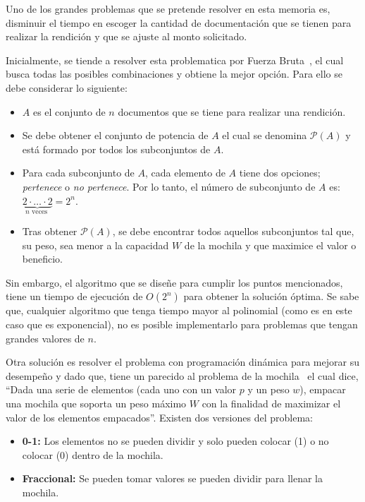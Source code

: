 Uno de los grandes problemas que se pretende resolver en esta memoria es, disminuir el tiempo en escoger la cantidad de documentación que se tienen para realizar la rendición y que se ajuste al monto solicitado.

Inicialmente, se tiende a resolver esta problematica por Fuerza Bruta~\cite{22}, el cual busca todas las posibles combinaciones y obtiene la mejor opción. Para ello se debe considerar lo siguiente:

\begin{itemize}
    \item $A$ es el conjunto de $n$ documentos que se tiene para realizar una rendición.
    \item Se debe obtener el conjunto de potencia de $A$ el cual se denomina $\mathcal{P}(A)$ y está formado por todos los subconjuntos de $A$.
    \item Para cada subconjunto de $A$, cada elemento de $A$ tiene dos opciones; \textit{pertenece} o \textit{no pertenece}. Por lo tanto, el número de subconjunto de $A$ es: $\underbrace{2\cdot \ldots \cdot 2}_{n\mbox{ veces }}=2^n$.
    \item Tras obtener $\mathcal{P}(A)$, se debe encontrar todos aquellos subconjuntos tal que, su peso, sea menor a la capacidad $W$ de la mochila y que maximice el valor o beneficio.
\end{itemize}

Sin embargo, el algoritmo que se diseñe para cumplir los puntos mencionados, tiene un tiempo de ejecución de $O(2^n)$ para obtener la solución óptima. Se sabe que, cualquier algoritmo que tenga tiempo mayor al polinomial (como es en este caso que es exponencial), no es posible implementarlo para problemas que tengan grandes valores de $n$.

Otra solución es resolver el problema con programación dinámica para mejorar su desempeño y dado que, tiene un parecido al problema de la mochila~\cite{22} el cual dice, “Dada una serie de elementos (cada uno con un valor $p$ y un peso $w$), empacar una mochila que soporta un peso máximo $W$ con la finalidad de maximizar el valor de los elementos empacados”. Existen dos versiones del problema:

\begin{itemize}
    \item \textbf{0-1:} Los elementos no se pueden dividir y solo pueden colocar (1) o no colocar (0) dentro de la mochila.
    \item \textbf{Fraccional:} Se pueden tomar valores se pueden dividir para llenar la mochila.
\end{itemize}

